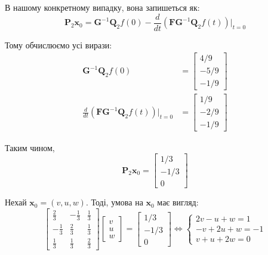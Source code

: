\documentclass{hw_template}
\begin{document}
В нашому конкретному випадку, вона запишеться як:
\begin{equation*}
    \boldsymbol{P}_2\mathbf{x}_0 = \boldsymbol{G}^{-1}\boldsymbol{Q}_2f(0) - \frac{d}{dt}(\boldsymbol{F}\boldsymbol{G}^{-1}\boldsymbol{Q}_2f(t))\Big|_{t = 0}
\end{equation*}

Тому обчислюємо усі вирази:
\begin{align*}
    \boldsymbol{G}^{-1}\boldsymbol{Q}_2f(0) &= \begin{bmatrix}
        4/9 \\ -5/9 \\ -1/9
    \end{bmatrix} \\
    \frac{d}{dt}(\boldsymbol{F}\boldsymbol{G}^{-1}\boldsymbol{Q}_2f(t))\Big|_{t = 0} &= \begin{bmatrix}
        1/9 \\ -2/9 \\ -1/9
    \end{bmatrix}
\end{align*}

Таким чином,
\begin{equation*}
    \boldsymbol{P}_2\mathbf{x}_0 = \begin{bmatrix}
        1/3 \\ -1/3 \\ 0
    \end{bmatrix}
\end{equation*}

Нехай $\mathbf{x}_0 = (v,u,w)$. Тоді, умова на $\mathbf{x}_0$ має вигляд:
\begin{equation*}
    \begin{bmatrix}
        \frac{2}{3} & -\frac{1}{3} & \frac{1}{3} \\
        -\frac{1}{3} & \frac{2}{3} & \frac{1}{3} \\
        \frac{1}{3} & \frac{1}{3} & \frac{2}{3}
    \end{bmatrix}\begin{bmatrix}
        v \\ u \\ w
    \end{bmatrix} = \begin{bmatrix}
        1/3 \\ -1/3 \\ 0
    \end{bmatrix} \iff \begin{cases}
        2v-u+w = 1 \\
        -v+2u+w = -1 \\
        v + u + 2w = 0
    \end{cases}
\end{equation*}
\end{document}
